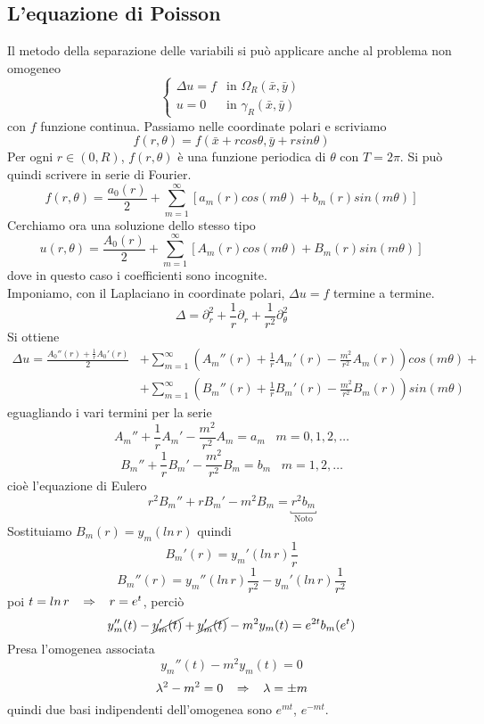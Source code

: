 \subsection{L'equazione di Poisson}
Il metodo della separazione delle variabili si pu\`o applicare anche al
problema non omogeneo
\[
	\left\{
	\begin{array}{ll}
		\Delta u= f	& \text{in } \Omega_R(\bar{x}, \bar{y}) \\
		u=0		& \text{in } \gamma_R(\bar{x}, \bar{y})
	\end{array}
	\right.
\]
con $f$ funzione continua. Passiamo nelle coordinate polari e scriviamo
\[
	f(r, \theta)= f(\bar{x}+rcos \theta, \bar{y}+ rsin \theta)
\]
Per ogni $r \in (0,R)$, $f(r, \theta)$ \`e una funzione periodica di $\theta$
con $T=2\pi$. Si pu\`o quindi scrivere in serie di Fourier.
\[
	f(r,\theta)= 	\frac{a_0(r)}{2}+  \sum_{m=1}^{\infty} \left[
	a_m (r) cos (m \theta)+
	b_m(r) sin (m\theta)
	\right]
\]
Cerchiamo ora una soluzione dello stesso tipo
\[
	u(r,\theta)= 	\frac{A_0(r)}{2}+  \sum_{m=1}^{\infty} \left[
	A_m (r) cos (m \theta)+
	B_m(r) sin (m\theta)
	\right]
\]
dove in questo caso i coefficienti sono incognite.\\
Imponiamo, con il Laplaciano in coordinate polari, $\Delta u= f$ termine
a termine.
\[
	\Delta = \partial_r^2 +\frac{1}{r}\partial_r +
\frac{1}{r^2}\partial_{\theta}^2
\]
Si ottiene
\begin{align*}
	\Delta u = \frac{A_0''(r)+ \frac{1}{r}A_0'(r)}{2} &+
	\sum_{m=1}^{\infty} \left(
	A_m''(r) + \frac{1}{r} A_m'(r) -\frac{m^2}{r^2}A_m(r)
	\right)cos(m\theta) + \\
	&+ \sum_{m=1}^{\infty} \left(
	B_m''(r) + \frac{1}{r} B_m'(r) -\frac{m^2}{r^2}B_m(r)
	\right) sin (m\theta)
\end{align*}
eguagliando i vari termini per la serie
\[
	A_m'' + \frac{1}{r} A_m'-\frac{m^2}{r^2} A_m= a_m \;\;\;m=0,1,2,\ldots
\]
\[
	B_m'' + \frac{1}{r} B_m'-\frac{m^2}{r^2} B_m= b_m \;\;\;m=1,2,\ldots
\]
cio\`e l'equazione di Eulero
\[
	r^2 B_m'' + rB_m' - m^2B_m= \underbracket{r^2b_m}_{\text{Noto}}
\]
Sostituiamo $B_m(r)= y_m(ln \, r)$ quindi
\[
	B_m'(r)= y_m'(ln \, r)\frac{1}{r}
\]
\[
	B_m''(r)= y_m''(ln \, r)\frac{1}{r^2}- y_m'(ln \, r)\frac{1}{r^2}
\]
poi $t=ln \, r \;\;\; \Rightarrow \;\;\; r=e^t$, perci\`o
\[
	y_m''(t)- \cancel{y_m'(t)} + \cancel{y_m'(t)} - m^2 y_m(t)=
e^{2t}b_m(e^t)
\]
Presa l'omogenea associata
\[
	y_m''(t) - m^2 y_m(t)=0
\]
\[
	\lambda^2 - m^2 =0 \;\;\; \Rightarrow \;\;\; \lambda= \pm m
\]
quindi due basi indipendenti dell'omogenea sono $e^{mt}$, $e^{-mt}$.\\
